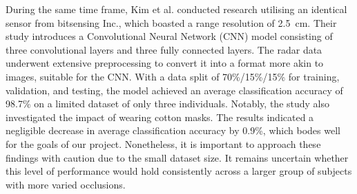 \documentclass{mpaper}
\begin{document}
During the same time frame, Kim et al. \cite{kim2020face} conducted research utilising an identical sensor from bitsensing Inc., which boasted a range resolution of \qty{2.5}{\cm}. Their study introduces a Convolutional Neural Network (CNN) model consisting of three convolutional layers and three fully connected layers. The radar data underwent extensive preprocessing to convert it into a format more akin to images, suitable for the CNN. With a data split of 70\%/15\%/15\% for training, validation, and testing, the model achieved an average classification accuracy of 98.7\% on a limited dataset of only three individuals. Notably, the study also investigated the impact of wearing cotton masks. The results indicated a negligible decrease in average classification accuracy by 0.9\%, which bodes well for the goals of our project. Nonetheless, it is important to approach these findings with caution due to the small dataset size. It remains uncertain whether this level of performance would hold consistently across a larger group of subjects with more varied occlusions.
\end{document}
